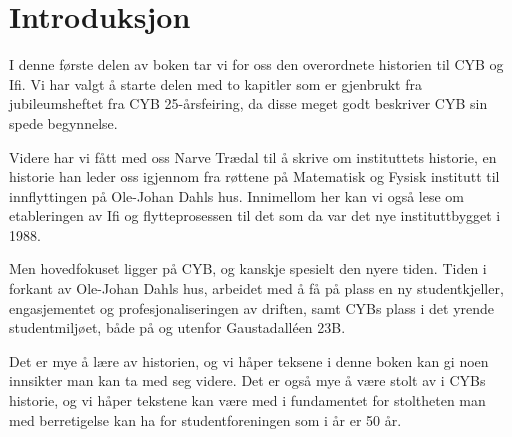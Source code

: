 \chapter*{Introduksjon}

\setcounter{footnote}{0}

I denne første delen av boken tar vi for oss den overordnete historien til CYB og Ifi. Vi har valgt å starte delen med to kapitler som er gjenbrukt fra jubileumsheftet fra CYB 25-årsfeiring, da disse meget godt beskriver CYB sin spede begynnelse.

Videre har vi fått med oss Narve Trædal til å skrive om instituttets historie, en historie han leder oss igjennom fra røttene på Matematisk og Fysisk institutt til innflyttingen på Ole-Johan Dahls hus. Innimellom her kan vi også lese om etableringen av Ifi og flytteprosessen til det som da var det nye instituttbygget i 1988.

Men hovedfokuset ligger på CYB, og kanskje spesielt den nyere tiden. Tiden i forkant av Ole-Johan Dahls hus, arbeidet med å få på plass en ny studentkjeller, engasjementet og profesjonaliseringen av driften, samt CYBs plass i det yrende studentmiljøet, både på og utenfor Gaustadalléen 23B.

Det er mye å lære av historien, og vi håper teksene i denne boken kan gi noen innsikter man kan ta med seg videre. Det er også mye å være stolt av i CYBs historie, og vi håper tekstene kan være med i fundamentet for stoltheten man med berretigelse kan ha for studentforeningen som i år er 50 år.